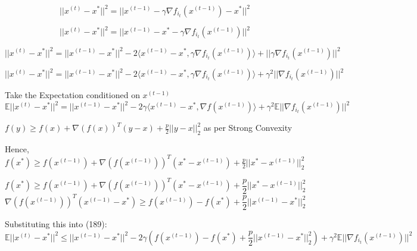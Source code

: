 \begin{equation}
    ||x^{(t)} - x^*||^2 = ||x^{(t - 1)} - \gamma \nabla f_{i_t}(x^{(t - 1)}) - x^*||^2
\end{equation}

\begin{equation}
    ||x^{(t)} - x^*||^2 = ||x^{(t - 1)} - x^* - \gamma \nabla f_{i_t}(x^{(t - 1)})||^2
\end{equation}

\begin{equation}
    ||x^{(t)} - x^*||^2 = ||x^{(t - 1)} - x^*||^2 - 2\langle x^{(t - 1)} - x^*,  \gamma \nabla f_{i_t}(x^{(t - 1)})\rangle + ||\gamma \nabla f_{i_t}(x^{(t - 1)})||^2
\end{equation}

\begin{equation}
    ||x^{(t)} - x^*||^2 = ||x^{(t - 1)} - x^*||^2 - 2\langle x^{(t - 1)} - x^*,  \gamma \nabla f_{i_t}(x^{(t - 1)})\rangle + \gamma^2 ||\nabla f_{i_t}(x^{(t - 1)})||^2
\end{equation}

\noindent Take the Expectation conditioned on $x^{(t - 1)}$
\begin{equation}
    \mathbb{E}||x^{(t)} - x^*||^2 = ||x^{(t - 1)} - x^*||^2 - 2\gamma \langle x^{(t - 1)} - x^*,  \nabla f(x^{(t - 1)})\rangle + \gamma^2 \mathbb{E} ||\nabla f_{i_t}(x^{(t - 1)})||^2
\end{equation}


\noindent $f(y) \geq f(x) + \nabla(f(x))^T (y - x) + \frac{p}{2} ||y - x||^2_2$ as per Strong Convexity\newline 


\noindent Hence, $f(x^*) \geq f(x^{(t - 1)}) + \nabla(f(x^{(t - 1)}))^T (x^* - x^{(t - 1)}) + \frac{p}{2} ||x^* - x^{(t - 1)}||^2_2$  

\begin{equation}
    f(x^*) \geq f(x^{(t - 1)}) + \nabla(f(x^{(t - 1)}))^T (x^* - x^{(t - 1)}) + \frac{p}{2} ||x^* - x^{(t - 1)}||^2_2
\end{equation}
\begin{equation}
    \nabla(f(x^{(t - 1)}))^T (x^{(t - 1)} - x^*) \geq f(x^{(t - 1)}) - f(x^*) + \frac{p}{2} ||x^{(t - 1)} - x^*||^2_2
\end{equation}

\noindent Substituting this into (189):
\begin{equation}
    \mathbb{E}||x^{(t)} - x^*||^2 \leq ||x^{(t - 1)} - x^*||^2 - 2\gamma (f(x^{(t - 1)}) - f(x^*) + \frac{p}{2} ||x^{(t - 1)} - x^*||^2_2) + \gamma^2 \mathbb{E} ||\nabla f_{i_t}(x^{(t - 1)})||^2
\end{equation}

